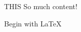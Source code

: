 \begin{sectionblock}{THIS}
So much content!
\end{sectionblock}

\begin{block}{\rule{0pt}{1in}Begin with \LaTeX}
  \tiny
\end{block}



